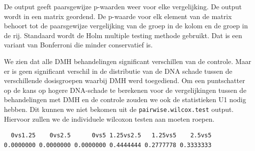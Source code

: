 \documentclass[
  dutch,
  letterpaper,
  12pt]{book}
\newenvironment{Shaded}{\begin{snugshade}}{\end{snugshade}}
\newcommand{\AttributeTok}[1]{\textcolor[rgb]{0.40,0.45,0.13}{#1}}
\newcommand{\ControlFlowTok}[1]{\textcolor[rgb]{0.00,0.23,0.31}{\textbf{#1}}}
\newcommand{\DecValTok}[1]{\textcolor[rgb]{0.68,0.00,0.00}{#1}}
\newcommand{\FunctionTok}[1]{\textcolor[rgb]{0.28,0.35,0.67}{#1}}
\newcommand{\NormalTok}[1]{\textcolor[rgb]{0.00,0.23,0.31}{#1}}
\newcommand{\OtherTok}[1]{\textcolor[rgb]{0.00,0.23,0.31}{#1}}
\newcommand{\SpecialCharTok}[1]{\textcolor[rgb]{0.37,0.37,0.37}{#1}}
\newcommand{\StringTok}[1]{\textcolor[rgb]{0.13,0.47,0.30}{#1}}
\theoremstyle{definition}
\theoremstyle{definition}
\theoremstyle{definition}
\theoremstyle{remark}
\begin{document}
De output geeft paarsgewijze p-waarden weer voor elke vergelijking. De
output wordt in een matrix geordend. De p-waarde voor elk element van de
matrix behoort tot de paarsgewijze vergelijking van de groep in de kolom
en de groep in de rij. Standaard wordt de Holm multiple testing methode
gebruikt. Dat is een variant van Bonferroni die minder conservatief is.

We zien dat alle DMH behandelingen significant verschillen van de
controle. Maar er is geen significant verschil in de distributie van de
DNA schade tussen de verschillende dosisgroepen waarbij DMH werd
toegediend. Om een puntschatter op de kans op hogere DNA-schade te
berekenen voor de vergelijkingen tussen de behandelingen met DMH en de
controle zouden we ook de statistieken U1 nodig hebben. Dit kunnen we
niet bekomen uit de \texttt{pairwise.wilcox.test} output. Hiervoor
zullen we de individuele wilcoxon testen aan moeten roepen.

\begin{Shaded}
\end{Shaded}

\begin{verbatim}
  0vs1.25    0vs2.5      0vs5 1.25vs2.5   1.25vs5    2.5vs5 
0.0000000 0.0000000 0.0000000 0.4444444 0.2777778 0.3333333 
\end{verbatim}
\end{document}

